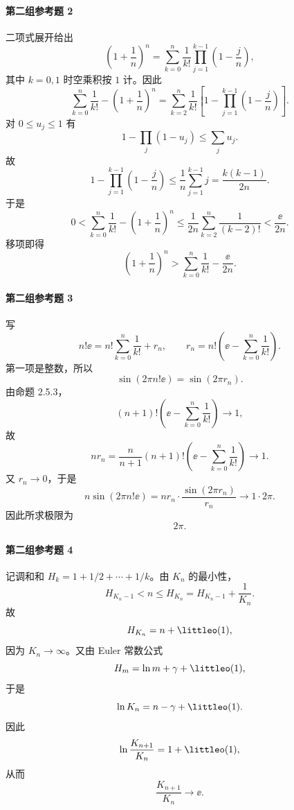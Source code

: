 \paragraph{第二组参考题 2}
\begin{xsolution}
二项式展开给出
\[
  \left(1+\frac1n\right)^n
  =\sum_{k=0}^n\frac1{k!}
   \prod_{j=1}^{k-1}\left(1-\frac jn\right),
\]
其中 $k=0,1$ 时空乘积按 $1$ 计。因此
\[
  \sum_{k=0}^n\frac1{k!}
  -\left(1+\frac1n\right)^n
  =\sum_{k=2}^n\frac1{k!}\left[
     1-\prod_{j=1}^{k-1}\left(1-\frac jn\right)
   \right].
\]
对 $0\le u_j\le1$ 有
\[
  1-\prod_j(1-u_j)\le\sum_j u_j.
\]
故
\[
  1-\prod_{j=1}^{k-1}\left(1-\frac jn\right)
  \le\frac1n\sum_{j=1}^{k-1}j
  =\frac{k(k-1)}{2n}.
\]
于是
\[
  0<\sum_{k=0}^n\frac1{k!}
  -\left(1+\frac1n\right)^n
  \le\frac1{2n}\sum_{k=2}^n\frac1{(k-2)!}
  <\frac\ee{2n}.
\]
移项即得
\[
  \boxed{\left(1+\frac1n\right)^n>
  \sum_{k=0}^n\frac1{k!}-\frac\ee{2n}}.
\]
\end{xsolution}

\paragraph{第二组参考题 3}
\begin{xsolution}
写
\[
  n!\ee=n!\sum_{k=0}^n\frac1{k!}+r_n,
  \qquad
  r_n=n!\left(\ee-\sum_{k=0}^n\frac1{k!}\right).
\]
第一项是整数，所以
\[
  \sin(2\pi n!\ee)=\sin(2\pi r_n).
\]
由命题 2.5.3，
\[
  (n+1)!\left(\ee-\sum_{k=0}^n\frac1{k!}\right)\to1,
\]
故
\[
  nr_n=\frac n{n+1}(n+1)!\left(\ee-\sum_{k=0}^n\frac1{k!}\right)\to1.
\]
又 $r_n\to0$，于是
\[
  n\sin(2\pi n!\ee)
  =nr_n\cdot\frac{\sin(2\pi r_n)}{r_n}
  \to1\cdot2\pi.
\]
因此所求极限为
\[
  \boxed{2\pi}.
\]
\end{xsolution}

\paragraph{第二组参考题 4}
\begin{xsolution}
记调和和 $H_k=1+1/2+\cdots+1/k$。由 $K_n$ 的最小性，
\[
  H_{K_n-1}<n\le H_{K_n}=H_{K_n-1}+\frac1{K_n}.
\]
故
\[
  H_{K_n}=n+\littleo(1),
\]
因为 $K_n\to\infty$。又由 Euler 常数公式
\[
  H_m=\ln m+\gamma+\littleo(1),
\]
于是
\[
  \ln K_n=n-\gamma+\littleo(1).
\]
因此
\[
  \ln\frac{K_{n+1}}{K_n}
  =1+\littleo(1),
\]
从而
\[
  \boxed{\frac{K_{n+1}}{K_n}\to\ee}.
\]
\end{xsolution}

